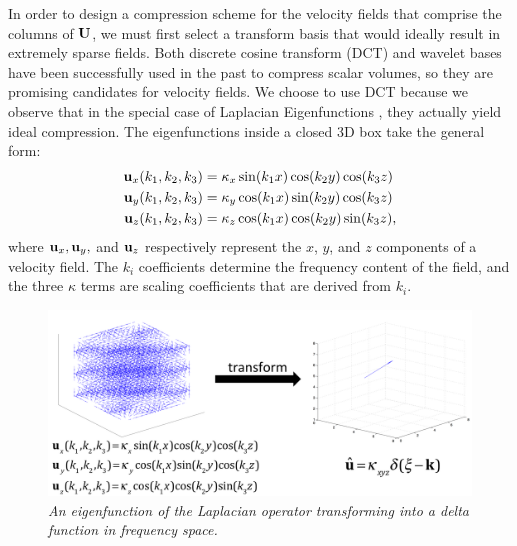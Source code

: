 In order to design a compression scheme for the velocity fields that comprise the columns of $\mathbf{U}$, we must first select a transform basis that would ideally result in extremely sparse fields. Both discrete cosine transform (DCT) \cite{Yeo:1995:VRD} and wavelet \cite{guthe2002,treib12turbulence} bases have been successfully used in the past to compress scalar volumes, so they are promising candidates for velocity fields. We choose to use DCT because we observe that in the special case of Laplacian Eigenfunctions \cite{DeWitt:2012}, they actually yield ideal compression. The eigenfunctions inside a closed 3D box take the general form:
\begin{equation}
\begin{split}
\mathbf{u}_x(k_1,k_2,k_3) &= \kappa_x \sin(k_1 x) \cos(k_2 y) \cos(k_3 z) \\
\mathbf{u}_y(k_1,k_2,k_3) &= \kappa_y \cos(k_1 x) \sin(k_2 y) \cos(k_3 z) \\
\mathbf{u}_z(k_1,k_2,k_3) &= \kappa_z \cos(k_1 x) \cos(k_2 y) \sin(k_3 z),
\end{split}
\end{equation}
where $\mathbf{u}_x, \mathbf{u}_y,$ and $\mathbf{u}_z$ respectively represent the $x$, $y$, and $z$ components of a velocity field. The $k_i$ coefficients determine the frequency content of the field, and the three $\kappa$ terms are scaling coefficients that are derived from $k_i$.

\begin{figure}
\label{fig:laplacians}
\includegraphics[width=\textwidth]{chap4/figures/laplacian_sparsity.png}
\caption{\em An eigenfunction of the Laplacian operator transforming into a delta function in frequency space.}
\end{figure}

